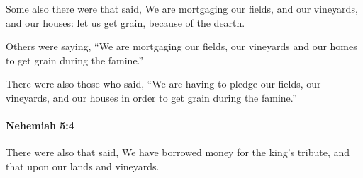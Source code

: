 			\begin{versebox}
					\item[BHS] 
					\item[LXX] 
					\item[ASV] Some also there were that said, We are mortgaging our fields, and our vineyards, and our houses: let us get grain, because of the dearth.
					\item[NIV] Others were saying, “We are mortgaging our fields, our vineyards and our homes to get grain during the famine.”
					\item[NRSV] There were also those who said, “We are having to pledge our fields, our vineyards, and our houses in order to get grain during the famine.”
			\end{versebox}

		\paragraph{Nehemiah 5:4} %
			\label{NEHEMIAH-5-4}

			There were also that said, We have borrowed money for the king’s tribute, and that upon our lands and vineyards.

